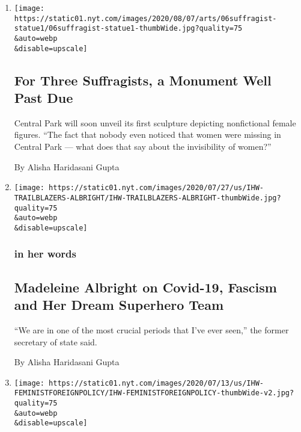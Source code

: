 \begin{enumerate}
\def\labelenumi{\arabic{enumi}.}
\item
  \href{/2020/08/06/arts/design/suffragist-19th-amendment-central-park.html}{}

  \texttt{[image: https://static01.nyt.com/images/2020/08/07/arts/06suffragist-statue1/06suffragist-statue1-thumbWide.jpg?quality=75\\\&auto=webp\\\&disable=upscale]}

  \hypertarget{for-three-suffragists-a-monument-well-past-due}{%
  \subsection{For Three Suffragists, a Monument Well Past
  Due}\label{for-three-suffragists-a-monument-well-past-due}}

  Central Park will soon unveil its first sculpture depicting
  nonfictional female figures. ``The fact that nobody even noticed that
  women were missing in Central Park --- what does that say about the
  invisibility of women?''

  By Alisha Haridasani Gupta
\item
  \href{/2020/07/29/us/madeleine-albright-interview-gender-covid.html}{}

  \texttt{[image: https://static01.nyt.com/images/2020/07/27/us/IHW-TRAILBLAZERS-ALBRIGHT/IHW-TRAILBLAZERS-ALBRIGHT-thumbWide.jpg?quality=75\\\&auto=webp\\\&disable=upscale]}

  \hypertarget{in-her-words}{%
  \subsubsection{in her words}\label{in-her-words}}

  \hypertarget{madeleine-albright-on-covid-19-fascism-and-her-dream-superhero-team}{%
  \subsection{Madeleine Albright on Covid-19, Fascism and Her Dream
  Superhero
  Team}\label{madeleine-albright-on-covid-19-fascism-and-her-dream-superhero-team}}

  ``We are in one of the most crucial periods that I've ever seen,'' the
  former secretary of state said.

  By Alisha Haridasani Gupta
\item
  \href{/2020/07/21/us/sweden-feminist-foreign-policy.html}{}

  \texttt{[image: https://static01.nyt.com/images/2020/07/13/us/IHW-FEMINISTFOREIGNPOLICY/IHW-FEMINISTFOREIGNPOLICY-thumbWide-v2.jpg?quality=75\\\&auto=webp\\\&disable=upscale]}


\end{enumerate}
